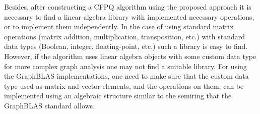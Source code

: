Besides, after constructing a CFPQ algorithm using the proposed approach it is necessary to find a linear algebra library with implemented necessary operations, or to implement them independently. In the case of using standard matrix operations (matrix addition, multiplication, transposition, etc.) with standard data types (Boolean, integer, floating-point, etc.) such a library is easy to find. However, if the algorithm uses linear algebra objects with some custom data type for more complex graph analysis one may not find a suitable library. For using the GraphBLAS implementations, one need to make sure that the custom data type used as matrix and vector elements, and the operations on them, can be implemented using an algebraic structure similar to the semiring that the GraphBLAS standard allows.

\clearpage